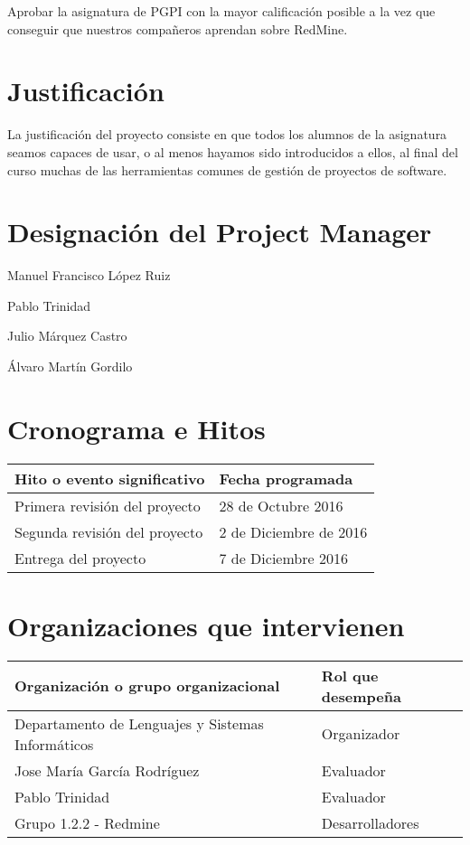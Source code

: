 \documentclass[a4paper,10pt]{scrartcl}
\begin{document}
	Aprobar la asignatura de PGPI con la mayor calificación posible a la vez que conseguir que nuestros compañeros aprendan sobre RedMine.
	
\section{Justificación}

	La justificación del proyecto consiste en que todos los alumnos de la asignatura seamos capaces de usar, o al menos hayamos sido introducidos a ellos, al final del curso muchas de las herramientas comunes de gestión de proyectos de software.


\section{Designación del Project Manager}

\begin{description}[align=right, labelwidth=4cm]
	\item [Nombre] Manuel Francisco López Ruiz
	\item [Reporta a] Pablo Trinidad
	\item [Supervisa a] Julio Márquez Castro
	\item [Supervisa a] Álvaro Martín Gordilo
\end{description}


\section{Cronograma e Hitos}

\begin{center}
	\begin{tabular}{| l | l |}
		\hline	
		\textbf{Hito o evento significativo} & \textbf{Fecha programada} \\ \hline
		Primera revisión del proyecto & 28 de Octubre 2016 \\ \hline
		Segunda revisión del proyecto & 2 de Diciembre de 2016 \\ \hline
 		Entrega del proyecto & 7 de Diciembre 2016 \\ \hline
	\end{tabular}
\end{center}

\section{Organizaciones que intervienen}
\begin{center}
	\begin{tabular}{| l | l |}
		\hline	
		\textbf{Organización o grupo organizacional} & \textbf{Rol que desempeña} \\ \hline
		Departamento de Lenguajes y Sistemas Informáticos & Organizador \\ \hline
		Jose María García Rodríguez & Evaluador \\ \hline
		Pablo Trinidad & Evaluador \\ \hline
		Grupo 1.2.2 - Redmine & Desarrolladores \\ \hline
	\end{tabular}
\end{center}
\end{document}
